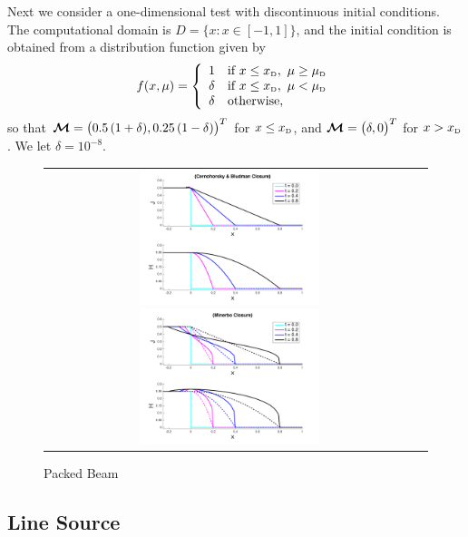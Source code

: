 Next we consider a one-dimensional test with discontinuous initial conditions.  
The computational domain is $D=\{x:x\in[-1,1]\}$, and the initial condition is obtained from a distribution function given by
\begin{equation}
  f(x,\mu)
  =\left\{
  \begin{array}{cl}
    1        & \text{if} ~ x\le x_{\mbox{\tiny D}}, ~ \mu\ge\mu_{\mbox{\tiny D}} \\
    \delta & \text{if} ~ x\le x_{\mbox{\tiny D}}, ~ \mu<   \mu_{\mbox{\tiny D}} \\
    \delta & \text{otherwise},
  \end{array}
  \right.
\end{equation}
so that $\boldsymbol{\mathcal{M}}=\big(0.5\,(1+\delta),0.25\,(1-\delta)\big)^{T}$ for $x\le x_{\mbox{\tiny D}}$, and $\boldsymbol{\mathcal{M}}=\big(\delta,0\big)^{T}$ for $x> x_{\mbox{\tiny D}}$.  
We let $\delta=10^{-8}$.  
\begin{figure}[h]
  \centering
  \begin{tabular}{cc}
    \includegraphics[width=0.5\textwidth]{figures/PackedBeam_ME_CB}
    \includegraphics[width=0.5\textwidth]{figures/PackedBeam_ME_MI}
  \end{tabular}
   \caption{Packed Beam}
  \label{fig:PackedBeam}
\end{figure}

\subsection{Line Source}

